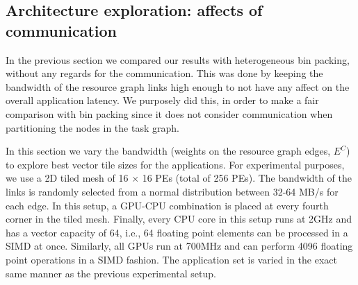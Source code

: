 \subsection{Architecture exploration: affects of communication}
\label{sec:arch-expl-with}

In the previous section we compared our results with heterogeneous bin
packing, without any regards for the communication. This was done by
keeping the bandwidth of the resource graph links high enough to not
have any affect on the overall application latency. We purposely did
this, in order to make a fair comparison with bin packing since it does
not consider communication when partitioning the nodes in the task
graph.

In this section we vary the bandwidth (weights on the resource graph
edges, $E^C$) to explore best vector tile sizes for the applications.
For experimental purposes, we use a 2D tiled mesh of 16 $\times$ 16 PEs
(total of 256 PEs). The bandwidth of the links is randomly selected from
a normal distribution between 32-64 MB/s for each edge. In this setup, a
GPU-CPU combination is placed at every fourth corner in the tiled
mesh. Finally, every CPU core in this setup runs at 2GHz and has a
vector capacity of 64, i.e., 64 floating point elements can be processed
in a SIMD at once. Similarly, all GPUs run at 700MHz and can perform
4096 floating point operations in a SIMD fashion. The application set is
varied in the exact same manner as the previous experimental setup.

